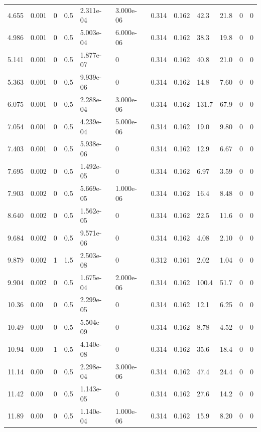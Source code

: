 \documentclass[preview]{standalone}
\begin{document}
{{\begin{tabular}{L{1.2cm}C{1.2cm} C{0.3cm}C{0.5cm} C{1.4cm}C{1.4cm} C{1.4cm}C{1.4cm} C{1.6cm}C{1.6cm} C{1.6cm}C{1.6cm}}
  4.655  &  0.001  & 0     & 0.5 &  2.311e-04  & 3.000e-06  &  0.314&   0.162& 42.3 & 21.8   &  0 & 0  \\ 
  4.986  &  0.001  & 0     & 0.5 &  5.003e-04  & 6.000e-06  &  0.314&   0.162& 38.3 & 19.8   &  0 & 0  \\ 
  5.141  &  0.001  & 0     & 0.5 &  1.877e-07  & 0  &  0.314&   0.162& 40.8 & 21.0   &  0 & 0  \\ 
  5.363  &  0.001  & 0     & 0.5 &  9.939e-06  & 0  &  0.314&   0.162& 14.8 & 7.60   &  0 & 0  \\ 
  6.075  &  0.001  & 0     & 0.5 &  2.288e-04  & 3.000e-06  &  0.314&   0.162& 131.7 & 67.9   &  0 & 0  \\ 
  7.054  &  0.001  & 0     & 0.5 &  4.239e-04  & 5.000e-06  &  0.314&   0.162& 19.0 & 9.80   &  0 & 0  \\ 
  7.403  &  0.001  & 0     & 0.5 &  5.938e-06  & 0  &  0.314&   0.162& 12.9 & 6.67   &  0 & 0  \\ 
  7.695  &  0.002  & 0     & 0.5 &  1.492e-05  & 0  &  0.314&   0.162& 6.97 & 3.59   &  0 & 0  \\ 
  7.903  &  0.002  & 0     & 0.5 &  5.669e-05  & 1.000e-06  &  0.314&   0.162& 16.4 & 8.48   &  0 & 0  \\ 
  8.640  &  0.002  & 0     & 0.5 &  1.562e-05  & 0  &  0.314&   0.162& 22.5 & 11.6   &  0 & 0  \\ 
  9.684  &  0.002  & 0     & 0.5 &  9.571e-06  & 0  &  0.314&   0.162& 4.08 & 2.10   &  0 & 0  \\ 
  9.879  &  0.002  & 1     & 1.5 &  2.503e-08  & 0  &  0.312&   0.161& 2.02 & 1.04   &  0 & 0  \\ 
  9.904  &  0.002  & 0     & 0.5 &  1.675e-04  & 2.000e-06  &  0.314&   0.162& 100.4 & 51.7   &  0 & 0  \\ 
  10.36  &  0.00  & 0     & 0.5 &  2.299e-05  & 0  &  0.314&   0.162& 12.1 & 6.25   &  0 & 0  \\ 
  10.49  &  0.00  & 0     & 0.5 &  5.504e-09  & 0  &  0.314&   0.162& 8.78 & 4.52   &  0 & 0  \\ 
  10.94  &  0.00  & 1     & 0.5 &  4.140e-08  & 0  &  0.314&   0.162& 35.6 & 18.4   &  0 & 0  \\ 
  11.14  &  0.00  & 0     & 0.5 &  2.298e-04  & 3.000e-06  &  0.314&   0.162& 47.4 & 24.4   &  0 & 0  \\ 
  11.42  &  0.00  & 0     & 0.5 &  1.143e-05  & 0  &  0.314&   0.162& 27.6 & 14.2   &  0 & 0  \\ 
  11.89  &  0.00  & 0     & 0.5 &  1.140e-04  & 1.000e-06  &  0.314&   0.162& 15.9 & 8.20   &  0 & 0  \\ 

\end{tabular}}}
\end{document}
